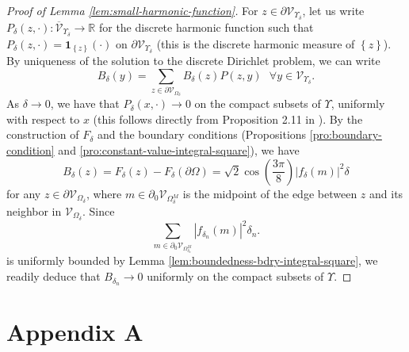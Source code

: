\documentclass[oneside,english]{amsart}
\numberwithin{equation}{section}
\numberwithin{figure}{section}
\theoremstyle{plain}
\theoremstyle{plain}
\theoremstyle{plain}
\theoremstyle{plain}
\theoremstyle{plain}
\theoremstyle{definition}
\theoremstyle{remark}
\begin{document}
\begin{proof}[Proof of Lemma \ref{lem:small-harmonic-function}]
 For $z\in\partial\mathcal{V}_{\Upsilon_{\delta}}$, let us write
$P_{\delta}\left(z,\cdot\right):\overline{\mathcal{V}}_{\Upsilon_{\delta}}\to\mathbb{R}$
for the discrete harmonic function such that $P_{\delta}\left(z,\cdot\right)=\mathbf{1}_{\left\{ z\right\} }\left(\cdot\right)$
on $\partial\mathcal{V}_{\Upsilon_{\delta}}$ (this is the discrete
harmonic measure of $\left\{ z\right\} $). By uniqueness of the solution
to the discrete Dirichlet problem, we can write
\[
B_{\delta}\left(y\right)=\sum_{z\in\partial\mathcal{V}_{\Omega_{\delta}}}B_{\delta}\left(z\right)P\left(z,y\right)\,\,\,\,\forall y\in\mathcal{V}_{\Upsilon_{\delta}}.
\]
As $\delta\to0$, we have that $P_{\delta}\left(x,\cdot\right)\to0$
on the compact subsets of $\Upsilon$, uniformly with respect to $x$
(this follows directly from Proposition 2.11 in \cite{chelkak-smirnov-i}).
By the construction of $F_{\delta}$ and the boundary conditions (Propositions
\ref{pro:boundary-condition} and \ref{pro:constant-value-integral-square}),
we have 
\[
B_{\delta}\left(z\right)=F_{\delta}\left(z\right)-F_{\delta}\left(\partial\Omega\right)=\sqrt{2}\cos\left(\frac{3\pi}{8}\right)\left|f_{\delta}\left(m\right)\right|^{2}\delta
\]
 for any $z\in\partial\mathcal{V}_{\Omega_{\delta}}$, where $m\in\partial_{0}\mathcal{V}_{\Omega_{\delta}^{M}}$
is the midpoint of the edge between $z$ and its neighbor in $\mathcal{V}_{\Omega_{\delta}}$.
Since 
\[
\sum_{m\in\partial_{0}\mathcal{V}_{\Omega_{\delta_{n}}^{M}}}\left|f_{\delta_{n}}\left(m\right)\right|^{2}\delta_{n}.
\]
is uniformly bounded by Lemma \ref{lem:boundedness-bdry-integral-square},
we readily deduce that $B_{\delta_{n}}\to0$ uniformly on the compact
subsets of $\Upsilon$.
\end{proof}

\section*{Appendix A}
\end{document}
